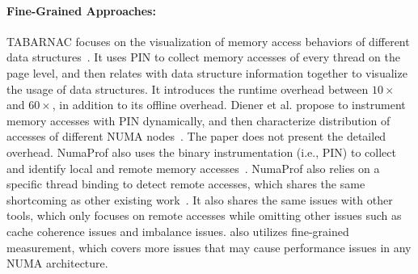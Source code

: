 \paragraph{Fine-Grained Approaches:} 
TABARNAC focuses on the visualization of memory access behaviors of different data structures~\cite{TABARNAC}. It uses PIN to collect memory accesses of every thread on the page level, and then relates with data structure information together to visualize the usage of data structures. It introduces the runtime overhead between $10\times$ and $60\times$, in addition to its offline overhead. Diener et al. propose to instrument memory accesses with PIN dynamically, and then characterize distribution of accesses of different NUMA nodes~\cite{diener2015characterizing}. The paper does not present the detailed overhead. 
NumaProf also uses the binary instrumentation  (i.e., PIN) to collect and identify local and remote memory accesses~\cite{valat:2018:numaprof}. 
NumaProf also relies on a specific thread binding to detect remote accesses, which shares the same shortcoming as other existing work~\cite{XuNuma, 7847070}. It also shares the same issues with other tools, which only focuses on remote accesses while omitting other issues such as cache coherence issues and imbalance issues. \NP{} also utilizes fine-grained measurement, which covers more issues that may cause performance issues in any NUMA architecture.    




